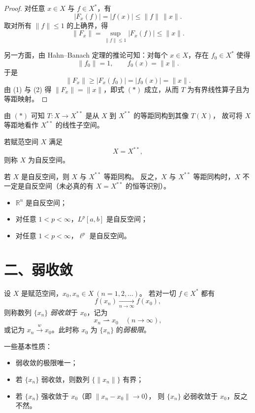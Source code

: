 \begin{proof}
对任意 $x\in X$ 与 $f\in X^*$，有
\[
|F_x(f)|=|f(x)|\le \|f\|\,\|x\|.
\]
取对所有 $\|f\|\le1$ 的上确界，得
\[
\|F_x\|=\sup_{\|f\|\le1}|F_x(f)|
      \le \|x\|.
\tag{1}
\]

另一方面，由 Hahn–Banach 定理的推论可知：对每个 $x\in X$，存在
$f_0\in X^*$ 使得
\[
\|f_0\|=1,\qquad f_0(x)=\|x\|.
\]
于是
\[
\|F_x\|\ge |F_x(f_0)|
         = |f_0(x)|
         = \|x\|.
\tag{2}
\]
由 (1) 与 (2) 得 $\|F_x\|=\|x\|$，即式 $(*)$ 成立，从而 $T$ 为有界线性算子且为等距映射。
\end{proof}

由 $(*)$ 可知 $T:X\to X^{**}$ 是从 $X$ 到 $X^{**}$ 的等距同构到其像 $T(X)$，
故可将 $X$ 等距地看作 $X^{**}$ 的线性子空间。
\begin{definition}[自反空间]
若赋范空间 $X$ 满足
\[
X = X^{**},
\]
则称 $X$ 为自反空间。
\end{definition}

\begin{remark}
若 $X$ 是自反空间，则 $X$ 与 $X^{**}$ 等距同构。
反之，$X$ 与 $X^{**}$ 等距同构时，$X$ 不一定是自反空间（未必真的有 $X=X^{**}$ 的恒等识别）。
\end{remark}

\begin{example}
\begin{itemize}
  \item $\mathbb{R}^n$ 是自反空间；
  \item 对任意 $1<p<\infty$，$L^p[a,b]$ 是自反空间；
  \item 对任意 $1<p<\infty$，$\ell^p$ 是自反空间。
\end{itemize}
\end{example}
\section*{二、弱收敛}

\begin{definition}[弱收敛]\label{def:weak-conv}
设 $X$ 是赋范空间，$x_0,x_n\in X\ (n=1,2,\dots)$。
若对一切 $f\in X^*$ 都有
\[
f(x_n)\xrightarrow[n\to\infty]{} f(x_0),
\]
则称数列 $\{x_n\}$ \emph{弱收敛}于 $x_0$，记为
\[
x_n \rightharpoonup x_0\quad (n\to\infty),
\]
或记为 $x_n \xrightarrow{w} x_0$。此时称 $x_0$ 为 $\{x_n\}$ 的\emph{弱极限}。
\end{definition}

一些基本性质：
\begin{itemize}
  \item 弱收敛的极限唯一；
  \item 若 $\{x_n\}$ 弱收敛，则数列 $\{\|x_n\|\}$ 有界；
  \item 若 $\{x_n\}$ 强收敛于 $x_0$（即 $\|x_n-x_0\|\to0$），
        则 $\{x_n\}$ 必弱收敛于 $x_0$，反之不然。
\end{itemize}